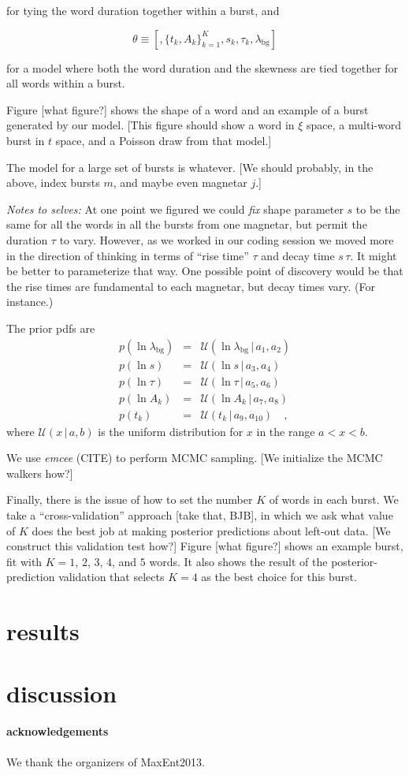 \documentclass[12pt]{article}
\newcommand{\project}[1]{\textsl{#1}}
\newcommand{\given}{\,|\,}
\newcommand{\mean}{\lambda}
\newcommand{\Uniform}{{\mathcal U}}
\newcommand{\bg}{\mathrm{bg}}
\begin{document}
for tying the word duration together within a burst, and

\begin{equation}
\theta \equiv [,\{t_k, A_k\}_{k=1}^K, s_k , \tau_k, \mean_{\bg} ]\end{equation}

for a model where both the word duration and the skewness are tied together for all words within a burst.

  
Figure [what figure?] shows the shape of a word
  and an example of a burst generated by our model.
[This figure should show a word in $\xi$ space,
  a multi-word burst in $t$ space,
  and a Poisson draw from that model.]

The model for a large set of bursts is whatever.
[We should probably, in the above, index bursts $m$,
  and maybe even magnetar $j$.]

\emph{Notes to selves:}
At one point we figured we could \emph{fix} shape parameter $s$
  to be the same for all the words in all the bursts from one magnetar,
  but permit the duration $\tau$ to vary.
However, as we worked in our coding session we moved more in the direction
  of thinking in terms of ``rise time'' $\tau$ and decay time $s\,\tau$.
It might be better to parameterize that way.
One possible point of discovery would be that the rise times
  are fundamental to each magnetar,
  but decay times vary.
(For instance.)

The prior pdfs are
\begin{eqnarray}
p(\ln\lambda_{\bg}) &=& \Uniform(\ln\lambda_{\bg}\given a_1, a_2)
\\
p(\ln s) &=& \Uniform(\ln s\given a_3, a_4)
\\
p(\ln\tau) &=& \Uniform(\ln\tau\given a_5, a_6)
\\
p(\ln A_k) &=& \Uniform(\ln A_k\given a_7, a_8)
\\
p(t_k) &=& \Uniform(t_k\given a_9, a_{10})
\quad,
\end{eqnarray}
where $\Uniform(x\given a, b)$ is the uniform distribution for $x$ in the range $a<x<b$.

We use \project{emcee} (CITE) to perform MCMC sampling.
[We initialize the MCMC walkers how?]

Finally, there is the issue of how to set the number $K$ of words in each burst.
We take a ``cross-validation'' approach [take that, BJB],
  in which we ask what value of $K$ does the best job at making posterior predictions
  about left-out data.
[We construct this validation test how?]
Figure [what figure?] shows an example burst,
  fit with $K=1$, $2$, $3$, $4$, and $5$ words.
It also shows the result of the posterior-prediction validation
  that selects $K=4$ as the best choice for this burst.

\section{results}

\section{discussion}

\paragraph{acknowledgements}
We thank the organizers of MaxEnt2013.
\end{document}
